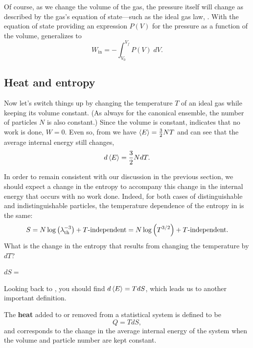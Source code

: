 Of course, as we change the volume of the gas, the pressure itself will change as described by the gas's equation of state---such as the ideal gas law, .
With the equation of state providing an expression $P(V)$ for the pressure as a function of the volume,  generalizes to
\begin{equation}
  \label{eq:work}
  W_{\text{in}} = -\int_{V_0}^{V_f} P(V) \; dV.
\end{equation}



\subsection{Heat and entropy}
Now let's switch things up by changing the temperature $T$ of an ideal gas while keeping its volume constant.
(As always for the canonical ensemble, the number of particles $N$ is also constant.)
Since the volume is constant,  indicates that no work is done, $W = 0$.
Even so, from  we have $\left\langle E \right\rangle = \frac{3}{2} NT$ and can see that the average internal energy still changes,
\begin{equation}
  \label{eq:dE_dT}
  d\left\langle E \right\rangle = \frac{3}{2} N dT.
\end{equation}

In order to remain consistent with our discussion in the previous section, we should expect a change in the entropy to accompany this change in the internal energy that occurs with no work done.
Indeed, for both cases of distinguishable and indistinguishable particles, the temperature dependence of the entropy in  is the same:
\begin{equation*}
  S = N\log\left(\lambda_{\mathrm{th}}^{-3}\right) + T\mbox{-independent} = N\log\left(T^{3 / 2}\right) + T\mbox{-independent}.
\end{equation*}
What is the change in the entropy that results from changing the temperature by $dT$?
\begin{mdframed}
  $\displaystyle dS = $ \\[60 pt]
\end{mdframed}
Looking back to , you should find $d\left\langle E \right\rangle = T dS$, which leads us to another important definition.

\begin{shaded}
  The \textbf{heat} added to or removed from a statistical system is defined to be
  \begin{equation}
    \label{eq:heat_def}
    Q = T dS,
  \end{equation}
  and corresponds to the change in the average internal energy of the system when the volume and particle number are kept constant.
\end{shaded}

